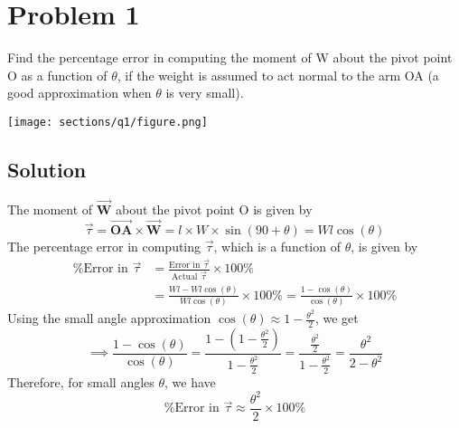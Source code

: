 \section*{Problem 1}

Find the percentage error in computing the moment of W about the pivot point O as a function of \( \theta \), if the weight is assumed to act normal to the arm OA (a good approximation when \( \theta \) is very small).

\begin{figure*}[h]
    \centering
    \texttt{[image: sections/q1/figure.png]}
\end{figure*}

\subsection*{Solution}

The moment of \( \vec{\mathbf{W}} \) about the pivot point O is given by
\[
    \vec{\tau} = \vec{\mathbf{OA}} \times \vec{\mathbf{W}}
    = l \times W \times \sin(90 + \theta)
    = W l \cos(\theta)
\]
The percentage error in computing \( \vec{\tau} \), which is a function of \( \theta \),  is given by
\begin{align*}
    \text{\%Error in } \vec{\tau}
     & =
    \frac{\text{Error in }\vec{\tau}}{\text{Actual }\vec{\tau}} \times 100\% \\
     & = \frac{W l - W l \cos(\theta)}{W l \cos(\theta)} \times 100\%
    = \frac{1 - \cos(\theta)}{\cos(\theta)} \times 100\%
\end{align*}
Using the small angle approximation \( \cos(\theta) \approx 1 - \frac{\theta^2}{2} \), we get
\[
    \implies \frac{1 - \cos(\theta)}{\cos(\theta)}
    = \frac{1 - (1 - \frac{\theta^2}{2})}{1 - \frac{\theta^2}{2}}
    = \frac{\frac{\theta^2}{2}}{1 - \frac{\theta^2}{2}}
    = \frac{\theta^2}{2 - \theta^2}
\]
Therefore, for small angles \( \theta \), we have
\[
    \boxed{
        \text{\%Error in } \vec{\tau} \approx \frac{\theta^2}{2} \times 100\%
    }
\]
